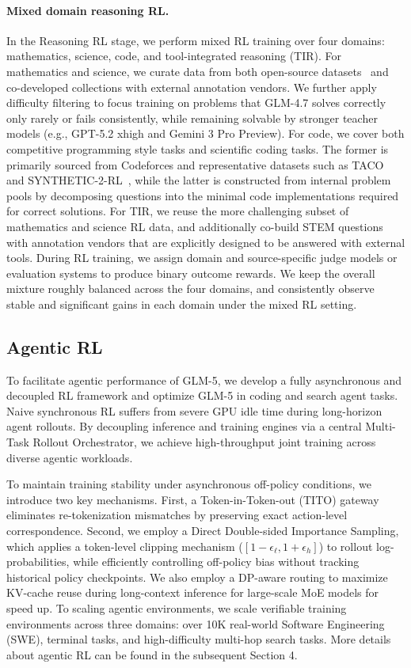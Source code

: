 \documentclass{article}
\theoremstyle{definition}
\begin{document}
\paragraph{Mixed domain reasoning RL.} In the Reasoning RL stage, we perform mixed RL training over four domains: mathematics, science, code, and tool-integrated reasoning (TIR). For mathematics and science, we curate data from both open-source datasets~\cite{du2025nemotron, moshkov2025aimo} and co-developed collections with external annotation vendors. We further apply difficulty filtering to focus training on problems that GLM-4.7 solves correctly only rarely or fails consistently, while remaining solvable by stronger teacher models (e.g., GPT-5.2 xhigh and Gemini 3 Pro Preview). For code, we cover both competitive programming style tasks and scientific coding tasks. The former is primarily sourced from Codeforces and representative datasets such as TACO~\cite{li2023taco} and SYNTHETIC-2-RL~\cite{synthetic2_blog_2025}, while the latter is constructed from internal problem pools by decomposing questions into the minimal code implementations required for correct solutions. For TIR, we reuse the more challenging subset of mathematics and science RL data, and additionally co-build STEM questions with annotation vendors that are explicitly designed to be answered with external tools. During RL training, we assign domain and source-specific judge models or evaluation systems to produce binary outcome rewards. We keep the overall mixture roughly balanced across the four domains, and consistently observe stable and significant gains in each domain under the mixed RL setting.

\subsection{Agentic RL}
To facilitate agentic performance of GLM-5, we develop a fully asynchronous and decoupled RL framework and optimize GLM-5 in coding and search agent tasks. Naive synchronous RL suffers from severe GPU idle time during long-horizon agent rollouts. By decoupling inference and training engines via a central Multi-Task Rollout Orchestrator, we achieve high-throughput joint training across diverse agentic workloads.

To maintain training stability under asynchronous off-policy conditions, we introduce two key mechanisms. First, a Token-in-Token-out (TITO) gateway eliminates re-tokenization mismatches by preserving exact action-level correspondence. Second, we employ a Direct Double-sided Importance Sampling, which applies a token-level clipping mechanism ($[1-\epsilon_\ell, 1+\epsilon_h]$) to rollout log-probabilities, while efficiently controlling off-policy bias without tracking historical policy checkpoints. We also employ a DP-aware routing to maximize KV-cache reuse during long-context inference for large-scale MoE models for speed up. To scaling agentic environments, we scale verifiable training environments across three domains: over 10K real-world Software Engineering (SWE), terminal tasks, and high-difficulty multi-hop search tasks. More details about agentic RL can be found in the subsequent Section 4.
\end{document}
